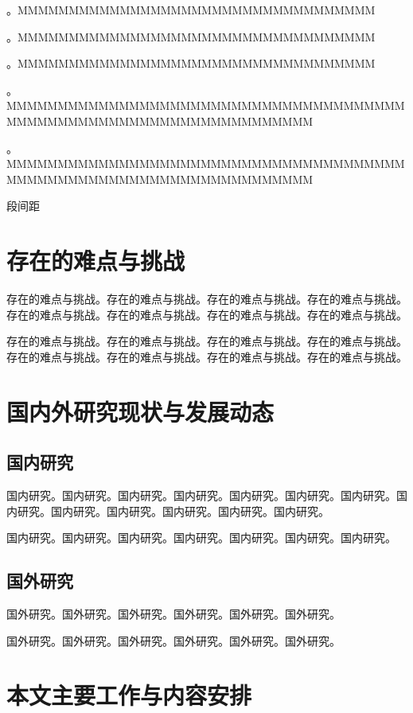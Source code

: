\documentclass{csuthesis}
\begin{document}
    {\noindent {} 。MMMMMMMMMMMMMMMMMMMMMMMMMMMMMMMMMMM}
    
    {\noindent {} 。MMMMMMMMMMMMMMMMMMMMMMMMMMMMMMMMMMM}
    
    {\noindent {} 。MMMMMMMMMMMMMMMMMMMMMMMMMMMMMMMMMMM}
    
    {\noindent {} 。MMMMMMMMMMMMMMMMMMMMMMMMMMMMMMMMMMMMMMMMMMMMMMMMMMMMMMMMMMMMMMMMMMMMM}
    
    {\noindent {} 。MMMMMMMMMMMMMMMMMMMMMMMMMMMMMMMMMMMMMMMMMMMMMMMMMMMMMMMMMMMMMMMMMMMMM}
    
    \noindent 段间距 \the\parskip
    
    \section{存在的难点与挑战}

    存在的难点与挑战。存在的难点与挑战。存在的难点与挑战。存在的难点与挑战。存在的难点与挑战。存在的难点与挑战。存在的难点与挑战。存在的难点与挑战。

    存在的难点与挑战。存在的难点与挑战。存在的难点与挑战。存在的难点与挑战。存在的难点与挑战。存在的难点与挑战。存在的难点与挑战。存在的难点与挑战。

    \section{国内外研究现状与发展动态}
    \subsection{国内研究}
    国内研究。国内研究。国内研究。国内研究。国内研究。国内研究。国内研究。国内研究。国内研究。国内研究。国内研究。国内研究。国内研究。

    国内研究。国内研究。国内研究。国内研究。国内研究。国内研究。国内研究。

    \subsection{国外研究}
    国外研究。国外研究。国外研究。国外研究。国外研究。国外研究。

    国外研究。国外研究。国外研究。国外研究。国外研究。国外研究。

    \section{本文主要工作与内容安排}
\end{document}

